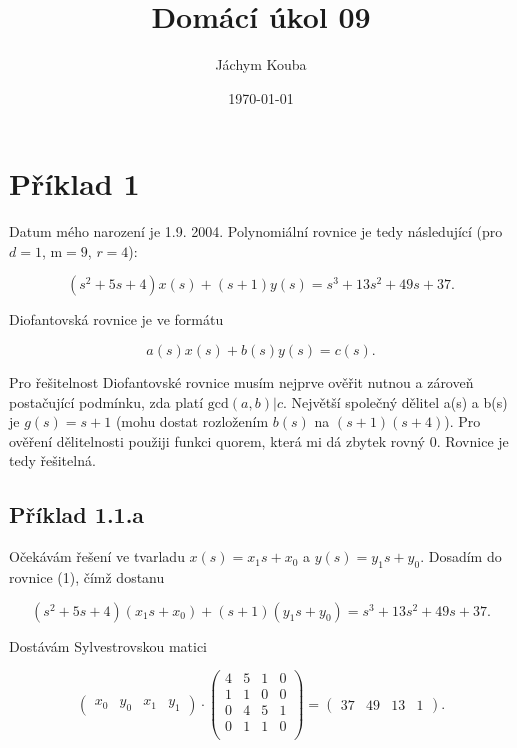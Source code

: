 \documentclass[12pt]{article}
\title{Domácí úkol 09}
\author{Jáchym Kouba}
\date{\today}
\begin{document}
\maketitle

\newpage
\section{Příklad 1}
Datum mého narození je 1.9. 2004. Polynomiální rovnice je tedy následující (pro $d=1$, m$=9$, $r=4$):

\begin{equation}
(s^2 + 5s + 4) x(s) + (s+1) y(s) = s^3 + 13s^2 + 49s + 37.
\end{equation}

Diofantovská rovnice je ve formátu

\begin{equation}
  a(s)x(s) + b(s)y(s) = c(s).
\end{equation}

Pro řešitelnost Diofantovské rovnice musím nejprve ověřit nutnou a zároveň
postačující podmínku, zda platí $\text{gcd}(a, b)|c$. Největší společný dělitel
a(s) a b(s) je $g(s) = s + 1$ (mohu dostat rozložením $b(s)$ na $(s+1)(s+4)$). Pro
ověření dělitelnosti použiji funkci quorem, která mi dá zbytek rovný 0. Rovnice
je tedy řešitelná.

\subsection{Příklad 1.1.a}
Očekávám řešení ve tvarladu $x(s) = x_1s + x_0$ a $y(s) = y_1s + y_0$. Dosadím do
rovnice (1), čímž dostanu

\begin{equation}
  (s^2 + 5s + 4) (x_1s + x_0) + (s+1) (y_1s + y_0) = s^3 + 13s^2 + 49s + 37.
\end{equation}

Dostávám Sylvestrovskou matici

\begin{equation}
  \begin{pmatrix}
    x_0 & y_0 & x_1 & y_1
  \end{pmatrix} \cdot
  \begin{pmatrix}
    4 & 5 & 1 & 0 \\
    1 & 1 & 0 & 0 \\
    0 & 4 & 5 & 1 \\
    0 & 1 & 1 & 0 \\
  \end{pmatrix} = 
  \begin{pmatrix}
    37 & 49 & 13 & 1
  \end{pmatrix}.
\end{equation}
\end{document}
